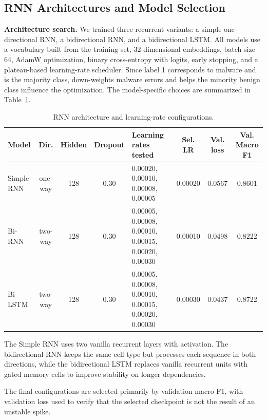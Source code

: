 \subsection{RNN Architectures and Model Selection} \label{subsec:task3_architectures}

\textbf{Architecture search.} We trained three recurrent variants: a simple one-directional RNN, a bidirectional RNN, and a bidirectional LSTM. All models use a vocabulary built from the training set, 32-dimensional embeddings, batch size 64, AdamW optimization, binary cross-entropy with logits, early stopping, and a plateau-based learning-rate scheduler. Since label 1 corresponds to malware and is the majority class,  down-weights malware errors and helps the minority benign class influence the optimization. The model-specific choices are summarized in Table~\ref{tab:task3_configs}.

\begin{table}[H]
\scriptsize
\centering
\setlength{\tabcolsep}{3pt}
\renewcommand{\arraystretch}{0.95}
\caption{RNN architecture and learning-rate configurations.}
\label{tab:task3_configs}
\begin{tabular*}{\linewidth}{@{\extracolsep{\fill}}lccclccc}
\toprule
\textbf{Model} & \textbf{Dir.} & \textbf{Hidden} & \textbf{Dropout} & \textbf{Learning rates tested} & \textbf{Sel. LR} & \textbf{Val. loss} & \textbf{Val. Macro F1} \\
\midrule
Simple RNN & one-way & 128 & 0.30 & 0.00020, 0.00010, 0.00008, 0.00005 & 0.00020 & 0.0567 & 0.8601 \\
Bi-RNN & two-way & 128 & 0.30 & 0.00005, 0.00008, 0.00010, 0.00015, 0.00020, 0.00030 & 0.00010 & 0.0498 & 0.8222 \\
Bi-LSTM & two-way & 128 & 0.30 & 0.00005, 0.00008, 0.00010, 0.00015, 0.00020, 0.00030 & 0.00030 & 0.0437 & 0.8722 \\
\bottomrule
\end{tabular*}
\end{table}

The Simple RNN uses two vanilla recurrent layers with  activation. The bidirectional RNN keeps the same cell type but processes each sequence in both directions, while the bidirectional LSTM replaces vanilla recurrent units with gated memory cells to improve stability on longer dependencies.

The final configurations are selected primarily by validation macro F1, with validation loss used to verify that the selected checkpoint is not the result of an unstable spike.

